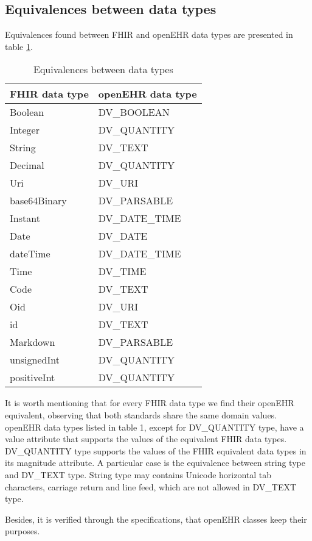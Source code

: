 \subsection{Equivalences between data types}

Equivalences found between FHIR and openEHR data types are presented in table \ref{table:equivalents}.

\begin{table}[h]
  \caption{Equivalences between data types}
  \label{table:equivalents}
  \begin{tabular}{l l}
    \hline
    FHIR data type &	openEHR data type \\
    \hline
    Boolean	& DV\_BOOLEAN \\
    Integer	& DV\_QUANTITY \\
    String	& DV\_TEXT \\
    Decimal	& DV\_QUANTITY \\
    Uri	& DV\_URI \\
    base64Binary	& DV\_PARSABLE \\
    Instant	& DV\_DATE\_TIME \\
    Date	& DV\_DATE \\
    dateTime	& DV\_DATE\_TIME \\
    Time	& DV\_TIME \\
    Code	& DV\_TEXT \\
    Oid	& DV\_URI \\
    id 	& DV\_TEXT \\
    Markdown	& DV\_PARSABLE \\
    unsignedInt	& DV\_QUANTITY \\
    positiveInt	& DV\_QUANTITY \\
    \hline
  \end{tabular}
\end{table}

It is worth mentioning that for every FHIR data type we find their openEHR equivalent, observing that both standards share the same domain values. openEHR data types listed in table 1, except for DV\_QUANTITY type, have a value attribute that supports the values of the equivalent FHIR data types. DV\_QUANTITY type supports the values of the FHIR equivalent data types in its magnitude attribute. A particular case is the equivalence between string type and DV\_TEXT type. String type may contains Unicode horizontal tab characters, carriage return and line feed, which are not allowed in DV\_TEXT type.

Besides, it is verified through the specifications, that openEHR classes keep their purposes.
